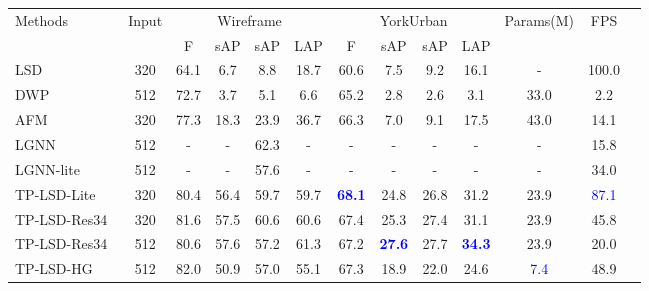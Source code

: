 \documentclass[letterpaper]{article} \usepackage{aaai22}  \usepackage{times}  \usepackage{helvet}  \usepackage{courier}  \usepackage[hyphens]{url}  \usepackage{graphicx} \urlstyle{rm} \def\UrlFont{\rm}  \usepackage{natbib}  \usepackage{caption} \DeclareCaptionStyle{ruled}{labelfont=normalfont,labelsep=colon,strut=off} \frenchspacing  \setlength{\pdfpagewidth}{8.5in}  \setlength{\pdfpageheight}{11in}  \usepackage{algorithm}
\begin{document}
\begin{table*}[t!]
\centering
\begin{adjustbox}{width=0.8\textwidth,center}
\begin{tabular}{lcccccccccccc}
\toprule
\multirow{2}{*}{Methods} & \multirow{2}{*}{Input} & \multicolumn{4}{c}{Wireframe} & \multicolumn{4}{c}{YorkUrban} & \multirow{2}{*}{Params(M)} & \multirow{2}{*}{FPS} \\ \cline{3-10}
                         &                        & F   & sAP & sAP & LAP  & F   & sAP & sAP & LAP  &                            &                      \\
\midrule
LSD~\cite{von2008lsd}    & 320                    & 64.1  & 6.7   & 8.8    & 18.7 & 60.6  & 7.5   & 9.2    & 16.1 & -                           & 100.0                \\
DWP~\cite{huang2018learning}& 512                    & 72.7  & 3.7     & 5.1    & 6.6  & 65.2  & 2.8     & 2.6    & 3.1  & 33.0                       & 2.2                  \\
AFM~\cite{xue2019learning}& 320                    & 77.3  & 18.3  & 23.9   & 36.7 & 66.3  & 7.0   & 9.1    & 17.5 & 43.0                       & 14.1                 \\
LGNN~\cite{meng2020lgnn} & 512                    & -     & -     & 62.3   & -    & -     & -     & -      & -    & -                           & 15.8                 \\
LGNN-lite~\cite{meng2020lgnn}& 512                    & -     & -     & 57.6   & -    & -     & -     & -      & -    & -                          & 34.0                 \\
TP-LSD-Lite~\cite{huang2020tp}& 320                    & 80.4  & 56.4  & 59.7   & 59.7 & \textcolor{blue}{\textbf{68.1}}  & 24.8  & 26.8   & 31.2 & 23.9                       & \textcolor{blue}{87.1}                 \\
TP-LSD-Res34~\cite{huang2020tp}& 320                    & 81.6  & 57.5  & 60.6   & 60.6 & 67.4  & 25.3  & 27.4   & 31.1 & 23.9                       & 45.8                 \\
TP-LSD-Res34~\cite{huang2020tp}& 512                    & 80.6  & 57.6  & 57.2   & 61.3 & 67.2  & \textcolor{blue}{\textbf{27.6}}  & 27.7   & \textcolor{blue}{\textbf{34.3}} & 23.9                       & 20.0                 \\
TP-LSD-HG~\cite{huang2020tp}& 512                    & 82.0  & 50.9  & 57.0   & 55.1 & 67.3  & 18.9  & 22.0   & 24.6 & \textcolor{blue}{7.4}                        & 48.9                 \\

\end{tabular}
\end{adjustbox}
\end{table*}
\end{document}
